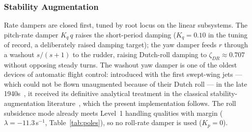 \subsubsection{Stability Augmentation}
Rate dampers are closed first, tuned by root locus on the linear
subsystems. The pitch-rate damper $K_q\,q$ raises the short-period
damping ($K_q=0.10$ in the tuning of record, a deliberately raised
damping target); the yaw damper feeds $r$ through a washout
$s/(s+1)$ to the rudder, raising Dutch-roll damping to
$\zeta_{DR}\approx0.707$ without opposing steady turns. The washout
yaw damper is one of the oldest devices of automatic flight control:
introduced with the first swept-wing jets --- which could not be flown
unaugmented because of their Dutch roll --- in the late
1940s~\cite{mcruer1981eighty}, it received its definitive analytical
treatment in the classical stability-augmentation
literature~\cite{mcruer1973aircraft,blakelock1991automatic}, which the
present implementation follows. The roll
subsidence mode already meets Level~1 handling qualities with margin
($\lambda=-11.3$\,s$^{-1}$, Table~\ref{tab:poles}), so no roll-rate damper
is used ($K_p=0$).

